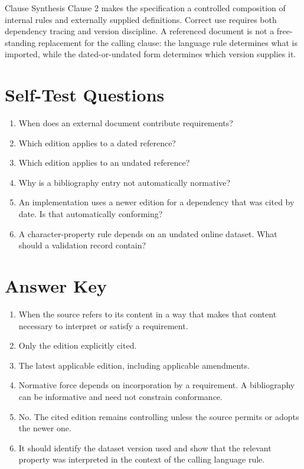 \documentclass[10pt,letterpaper]{article}
\begin{document}
\begin{CornellSummaryBox}{Clause Synthesis}
Clause 2 makes the specification a controlled composition of internal rules and externally supplied definitions. Correct use requires both dependency tracing and version discipline. A referenced document is not a free-standing replacement for the calling clause: the language rule determines what is imported, while the dated-or-undated form determines which version supplies it.
\end{CornellSummaryBox}



\clearpage
\section{Self-Test Questions}
\begin{enumerate}
  \item When does an external document contribute requirements?
  \item Which edition applies to a dated reference?
  \item Which edition applies to an undated reference?
  \item Why is a bibliography entry not automatically normative?
  \item An implementation uses a newer edition for a dependency that was cited by date. Is that automatically conforming?
  \item A character-property rule depends on an undated online dataset. What should a validation record contain?
\end{enumerate}

\clearpage
\section{Answer Key}
\begin{enumerate}
  \item When the source refers to its content in a way that makes that content necessary to interpret or satisfy a requirement.

  \item Only the edition explicitly cited.

  \item The latest applicable edition, including applicable amendments.

  \item Normative force depends on incorporation by a requirement. A bibliography can be informative and need not constrain conformance.

  \item No. The cited edition remains controlling unless the source permits or adopts the newer one.

  \item It should identify the dataset version used and show that the relevant property was interpreted in the context of the calling language rule.
\end{enumerate}
\end{document}
